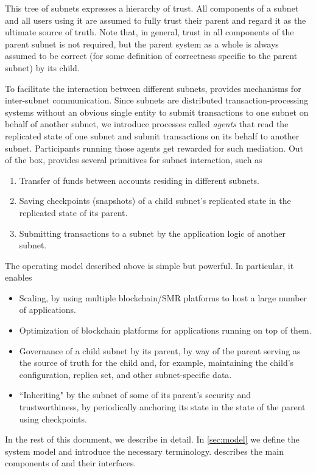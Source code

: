 This tree of subnets expresses a hierarchy of trust.
All components of a subnet and all users using it are assumed to fully trust their parent and regard it as the ultimate source of truth.
Note that, in general, trust in all components of the parent subnet is not required, but the parent system as a whole is always assumed to be correct (for some definition of correctness specific to the parent subnet) by its child.

To facilitate the interaction between different subnets, \ipc provides mechanisms for inter-subnet communication.
Since subnets are distributed transaction-processing systems
without an obvious single entity to submit transactions to one subnet on behalf of another subnet,
we introduce processes called \emph{\ipc agents} that read the replicated state of one subnet and submit transactions on its behalf to another subnet.
Participants running those \ipc agents get rewarded for such mediation.
Out of the box, \ipc provides several primitives for subnet interaction, such as
\begin{enumerate}
    \item Transfer of funds between accounts residing in different subnets.
    \item Saving checkpoints (snapshots) of a child subnet's replicated state in the replicated state of its parent.
    \item Submitting transactions to a subnet by the application logic of another subnet.
\end{enumerate}

The operating model described above is simple but powerful.
In particular, it enables
\begin{itemize}
    \item Scaling, by using multiple blockchain/SMR platforms to host a large number of applications.
    \item Optimization of blockchain platforms for applications running on top of them.
    \item Governance of a child subnet by its parent, by way of the parent serving as the source of truth for the child and, for example, maintaining the child's configuration, replica set, and other subnet-specific data.
    \item ``Inheriting" by the subnet of some of its parent's security and trustworthiness, by periodically anchoring its state in the state of the parent using checkpoints.
\end{itemize}

In the rest of this document, we describe \ipc in detail.
In \cref{sec:model} we define the system model and introduce the necessary terminology.
 describes the main components of \ipc and their interfaces.
